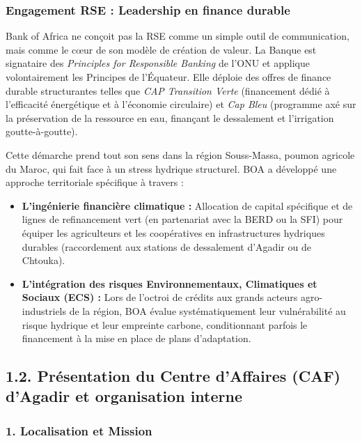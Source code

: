 \subsubsection*{Engagement RSE : Leadership en finance durable}

Bank of Africa ne conçoit pas la RSE comme un simple outil de communication, mais comme le c\oe{}ur de son modèle de création de valeur. La Banque est signataire des \textit{Principles for Responsible Banking} de l'ONU et applique volontairement les Principes de l'Équateur. Elle déploie des offres de finance durable structurantes telles que \textit{CAP Transition Verte} (financement dédié à l'efficacité énergétique et à l'économie circulaire) et \textit{Cap Bleu} (programme axé sur la préservation de la ressource en eau, finançant le dessalement et l'irrigation goutte-à-goutte).

Cette démarche prend tout son sens dans la région Souss-Massa, poumon agricole du Maroc, qui fait face à un stress hydrique structurel. BOA a développé une approche territoriale spécifique à travers :

\begin{itemize}
  \item \textbf{L'ingénierie financière climatique :} Allocation de capital spécifique et de lignes de refinancement vert (en partenariat avec la BERD ou la SFI) pour équiper les agriculteurs et les coopératives en infrastructures hydriques durables (raccordement aux stations de dessalement d'Agadir ou de Chtouka).

  \item \textbf{L'intégration des risques Environnementaux, Climatiques et Sociaux (ECS) :} Lors de l'octroi de crédits aux grands acteurs agro-industriels de la région, BOA évalue systématiquement leur vulnérabilité au risque hydrique et leur empreinte carbone, conditionnant parfois le financement à la mise en place de plans d'adaptation.
\end{itemize}

\subsection*{1.2. Présentation du Centre d'Affaires (CAF) d'Agadir et organisation interne}

\subsubsection*{1. Localisation et Mission}

